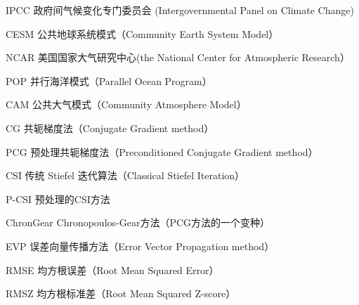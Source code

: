 \begin{denotation}[3cm]
\item[IPCC] 政府间气候变化专门委员会 (Intergovernmental Panel on Climate Change)
\item[CESM]  公共地球系统模式（Community Earth System Model）
\item[NCAR]  美国国家大气研究中心(the National Center for Atmospheric Research）
\item[POP]  并行海洋模式（Parallel Ocean Program）
\item[CAM]  公共大气模式（Community Atmosphere Model）
\item[CG]	共轭梯度法（Conjugate Gradient method）
\item[PCG]  预处理共轭梯度法（Preconditioned Conjugate Gradient method）
\item[CSI]  传统 Stiefel 迭代算法（Classical Stiefel Iteration）
\item[P-CSI]  预处理的CSI方法
\item[ChronGear] Chronopoulos-Gear方法（PCG方法的一个变种）
\item[EVP] 误差向量传播方法（Error Vector Propagation method）
\item[RMSE] 均方根误差（Root Mean Squared Error）
\item[RMSZ] 均方根标准差（Root Mean Squared Z-score）
\end{denotation}
